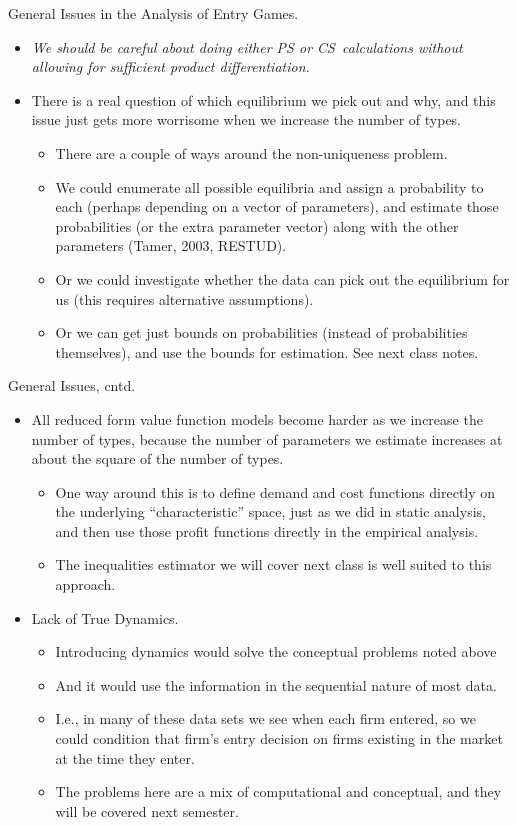 \documentclass[aspectratio=169,11pt]{beamer}
\begin{document}
\begin{frame}{General Issues in the Analysis of Entry Games.}
\footnotesize

\begin{itemize}
\item \textit{We should be careful about doing either PS or CS\ calculations
without allowing for sufficient product differentiation. }
\item There is a real question of which equilibrium we pick out and why, and
this issue just gets more worrisome when we increase the number of types.
\begin{itemize}
\item There are a couple of ways around the non-uniqueness problem.
\item We could enumerate all possible equilibria and assign a probability to
each (perhaps depending on a vector of parameters), and estimate those
probabilities (or the extra parameter vector) along with the other
parameters (Tamer, 2003, RESTUD).
\item Or we could investigate whether the data can pick out the equilibrium
for us (this requires alternative assumptions).
\item Or we can get just bounds on probabilities (instead of probabilities
themselves), and use the bounds for estimation. See next class notes.
\end{itemize}
\end{itemize}
\end{frame}

\begin{frame}{General Issues, cntd.}
\footnotesize
\begin{itemize}
\item All reduced form value function models become harder as we increase
the number of types, because the number of parameters we estimate increases
at about the square of the number of types.
\begin{itemize}
\item One way around this is to define demand and cost functions directly on
the underlying ``characteristic''  space,
just as we did in static analysis, and then use those profit functions
directly in the empirical analysis.
\item The inequalities estimator we will cover next class is well suited to
this approach.
\end{itemize}
\item Lack of True Dynamics.
\begin{itemize}
\item Introducing dynamics would solve the conceptual problems noted above
\item And it would use the information in the sequential nature of most data.
\item I.e., in many of these data sets we see when each firm entered, so we
could condition that firm's entry decision on firms existing in the market
at the time they enter.
\item The problems here are a mix of computational and conceptual, and they
will be covered next semester.
\end{itemize}
\end{itemize}
\end{frame}
\end{document}
